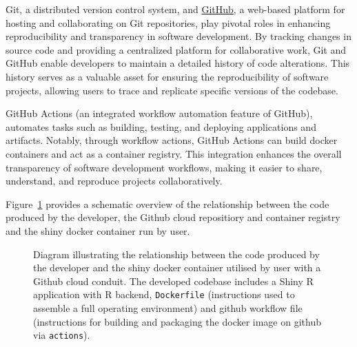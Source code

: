 \documentclass[
  8pt,
  a4paper]{article}
\begin{document}
Git, a distributed version control system, and
\href{https://github.com/}{GitHub}, a web-based platform for hosting and
collaborating on Git repositories, play pivotal roles in enhancing
reproducibility and transparency in software development. By tracking
changes in source code and providing a centralized platform for
collaborative work, Git and GitHub enable developers to maintain a
detailed history of code alterations. This history serves as a valuable
asset for ensuring the reproducibility of software projects, allowing
users to trace and replicate specific versions of the codebase.

GitHub Actions (an integrated workflow automation feature of GitHub),
automates tasks such as building, testing, and deploying applications
and artifacts. Notably, through workflow actions, GitHub Actions can
build docker containers and act as a container registry. This
integration enhances the overall transparency of software development
workflows, making it easier to share, understand, and reproduce projects
collaboratively.

Figure~\ref{fig-diagram} provides a schematic overview of the
relationship between the code produced by the developer, the Github
cloud repositiory and container registry and the shiny docker container
run by user.

\begin{figure}


\caption{\label{fig-diagram}Diagram illustrating the relationship
between the code produced by the developer and the shiny docker
container utilised by user with a Github cloud conduit. The developed
codebase includes a Shiny R application with R backend,
\texttt{Dockerfile} (instructions used to assemble a full operating
environment) and github workflow file (instructions for building and
packaging the docker image on github via \texttt{actions}).}

\end{figure}%
\end{document}
